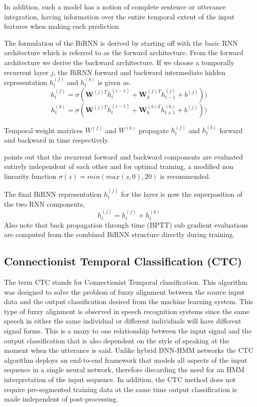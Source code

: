 In addition, such a model has a notion of complete sentence or utterance  integration, having information over the entire temporal extent of the input features when making each prediction. 

The formulation of the BiRNN is derived by starting off with the basic RNN architecture which is referred to as the forward architecture.  From the forward architecture we derive the backward architecture. If we choose a temporally recurrent layer $j$, the BiRNN forward and backward intermediate hidden representation $h^{(f)}_t$ and $h^{(b)}_t$ is given as. 
\begin{equation}h_t^{(f)}=\sigma(\mathbf{W}^{(j)T}h_t^{(i-1)}+\mathbf{W}^{(f)T}_kh_{t-1}^{(j)}+b^{(j)}))
\label{eqn_c3_ds01}\end{equation}
\begin{equation}h_t^{(b)}=\sigma(\mathbf{W}^{(j)T}h_t^{(i-1)}+\mathbf{W}^{(b)T}_kh_{t+1}^{(b)}+b^{(j)}))
\label{eqn_c3_ds02}\end{equation}

Temporal weight matrices $W^{(f)}$ and $W^{(b)}$ propagate $h^{(f)}_t$  and $h^{(b)}_t$ forward and backward in time respectively. 

\cite{hannun2014first} points out that the recurrent forward and backward components are evaluated entirely independent of each other and for optimal training, a modified non linearity function $\sigma(z) = min(max(z, 0), 20)$ is recommended. 

The final BiRNN representation $h^{(j)}_t$ for the layer is now the superposition of the two RNN components,
 \begin{equation}h_t^{(j)}=h_t^{(f)}+h_t^{(b)}
\label{eqn_c3_ds03}\end{equation}
Also note that back propagation through time (BPTT) sub gradient evaluations are computed from the combined BiRNN structure directly during training.

\subsection{Connectionist Temporal Classification (CTC)}
The term CTC stands for Connectionist Temporal classification.  This algorithm was designed to solve the problem of fuzzy alignment between the source input data and the output classification desired from the machine learning system.  This type of fuzzy alignment is observed in speech recognition systems since the same speech in either the same individual or different individuals will have different signal forms.  This is a many to one relationship between the input signal and the output classification that is also dependent on the style of speaking at the moment when the utterance is said.  Unlike hybrid DNN-HMM networks the CTC algorithm deploys an end-to-end framework that models all aspects of the input sequence in a single neural network, therefore discarding the need for an HMM interpretation of the input sequence. In  addition, the CTC method does not require pre-segmented training data at the same time output classification is made independent of post-processing.

